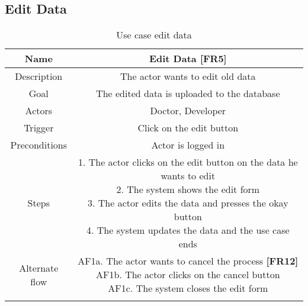 \subsection{Edit Data}
\begin{table}[H]
	\begin{center}\scriptsize
		\begin{tabular}{ |c|c| }
			\hline
			Name & Edit Data \textbf{[FR5]} \\ 
			\hline	
			Description & The actor wants to edit old data \\ 
			\hline
			Goal & The edited data is uploaded to the database \\ 
			\hline
			Actors & Doctor, Developer \\ 
			\hline
			Trigger & Click on the edit button \\ 
			\hline
			Preconditions & Actor is logged in \\ 
			\hline
			Steps & \parbox{9cm}{\vspace{.5\baselineskip}
				1. The actor clicks on the edit button on the data he wants to edit\\
				2. The system shows the edit form\\
				3. The actor edits the data and presses the okay button\\
				4. The system updates the data and the use case ends
			}\\
			\hline
			Alternate flow & \parbox{9cm}{\vspace{.5\baselineskip}
				AF1a. The actor wants to cancel the process \textbf{[FR12]}\\
				AF1b. The actor clicks on the cancel button\\
				AF1c. The system closes the edit form}\\ \\ 
			\hline
		\end{tabular}
	\end{center}\normalsize
	\caption{Use case edit data}
\end{table}


